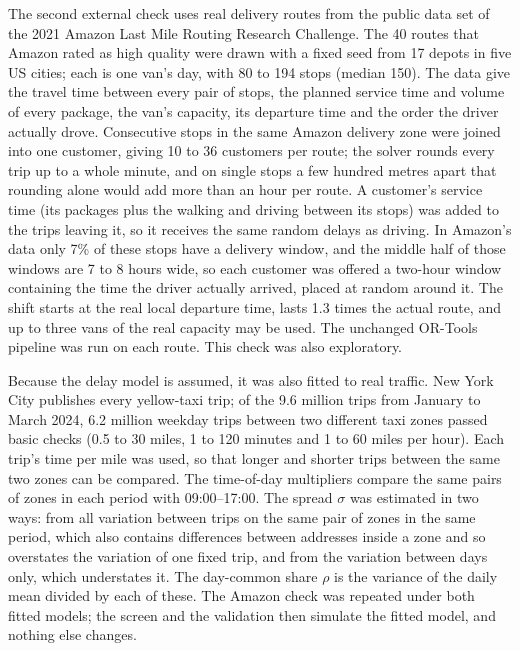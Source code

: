 \documentclass[12pt,letterpaper]{article}
\newcommand{\AmzRoutes}{40}
\newcommand{\AmzStations}{17}
\newcommand{\AmzStopsMin}{80}
\newcommand{\AmzStopsMax}{194}
\newcommand{\AmzStopsMed}{150}
\newcommand{\AmzCustMin}{10}
\newcommand{\AmzCustMax}{36}
\newcommand{\AmzCities}{five}
\newcommand{\AmzWindowShare}{7}
\newcommand{\AmzWindowLo}{7}
\newcommand{\AmzWindowHi}{8}
\newcommand{\NycTripsM}{6.2}
\newcommand{\NycRawM}{9.6}
\begin{document}
The second external check uses real delivery routes from the public data set of
the 2021 Amazon Last Mile Routing Research Challenge\cite{merchan2022}. The \AmzRoutes{} routes
that Amazon rated as high quality were drawn with a fixed seed from
\AmzStations{} depots in \AmzCities{} US cities; each is one van's day, with
\AmzStopsMin{} to \AmzStopsMax{} stops (median \AmzStopsMed). The data give the
travel time between every pair of stops, the planned service time and volume of
every package, the van's capacity, its departure time and the order the driver
actually drove. Consecutive stops in the same Amazon delivery zone were joined into
one customer, giving \AmzCustMin{} to \AmzCustMax{} customers per route; the
solver rounds every trip up to a whole minute, and on single stops a few hundred
metres apart that rounding alone would add more than an hour per route. A
customer's service time (its packages plus the walking and driving between its
stops) was added to the trips leaving it, so it receives the same random delays as
driving. In Amazon's data only \AmzWindowShare\% of these stops have a delivery window,
and the middle half of those windows are \AmzWindowLo{} to \AmzWindowHi{} hours wide, so each customer was offered a two-hour window containing the time the
driver actually arrived, placed at random around it. The shift starts at the real
local departure time, lasts 1.3 times the actual route, and up to three vans of the
real capacity may be used. The unchanged OR-Tools pipeline was run on each route.
This check was also exploratory.

Because the delay model is assumed, it was also fitted to real traffic. New York
City publishes every yellow-taxi trip\cite{nyctlc2024}; of the \NycRawM{} million
trips from January to March 2024, \NycTripsM{} million weekday trips between two
different taxi zones passed basic checks (0.5 to 30 miles, 1 to 120 minutes and 1
to 60 miles per hour). Each trip's time per mile was used, so that longer and
shorter trips between the same two zones can be compared. The time-of-day
multipliers compare the same pairs of zones in each period with 09:00--17:00. The
spread $\sigma$ was estimated in two ways: from all variation between trips on the
same pair of zones in the same period, which also contains differences between
addresses inside a zone and so overstates the variation of one fixed trip, and from
the variation between days only, which understates it. The day-common share $\rho$
is the variance of the daily mean divided by each of these. The Amazon check was
repeated under both fitted models; the screen and the validation then simulate the
fitted model, and nothing else changes.
\end{document}
